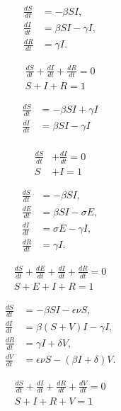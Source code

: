\documentclass[14pt]{extarticle}
\begin{document}
	
	
	\begin{align*}
		\frac{dS}{dt} &= -\beta SI,\\[0.5em]
		\frac{dI}{dt} &= \beta SI - \gamma I,\\[0.5em]
		\frac{dR}{dt} &= \gamma I.
	\end{align*}
	
	\begin{align*}
	\frac{dS}{dt} + \frac{dI}{dt} + \frac{dR}{dt} = 0\\[0.5em]
	S + I + R = 1
	\end{align*}
	
	
	\newpage
	
	
	\begin{align*}
	\frac{dS}{dt} &= -\beta SI + \gamma I\\[0.5em]
	\frac{dI}{dt} &= \beta SI - \gamma I\\[0.5em]
	\end{align*}
	
	\begin{align*}
	\frac{dS}{dt} &+ \frac{dI}{dt} = 0\\[0.5em]
	S &+ I = 1
	\end{align*}

		\newpage
	
	
\begin{align*}
\frac{dS}{dt} &= -\beta SI,\\[0.5em]
\frac{dE}{dt} &= \beta SI - \sigma E,\\[0.5em]
\frac{dI}{dt} &= \sigma E - \gamma I,\\[0.5em] 
\frac{dR}{dt} &= \gamma I.
\end{align*}

	\begin{align*}
\frac{dS}{dt} + \frac{dE}{dt} + \frac{dI}{dt} + \frac{dR}{dt} = 0\\[0.5em]
S + E + I + R = 1
\end{align*}
	
			\newpage
	
	
	\begin{align*}
	\frac{dS}{dt} &= -\beta SI - \epsilon\nu S,\\[0.5em]
	\frac{dI}{dt} &= \beta (S+V)I - \gamma I,\\[0.5em] 
	\frac{dR}{dt} &= \gamma I + \delta V,\\[0.5em]
	\frac{dV}{dt} &=  \epsilon\nu S - (\beta I+\delta)V.
	\end{align*}
	
	\begin{align*}
		\frac{dS}{dt} + \frac{dI}{dt} + \frac{dR}{dt} + \frac{dV}{dt} = 0\\[0.5em]
		S + I + R + V = 1
	\end{align*}
	
\end{document}
